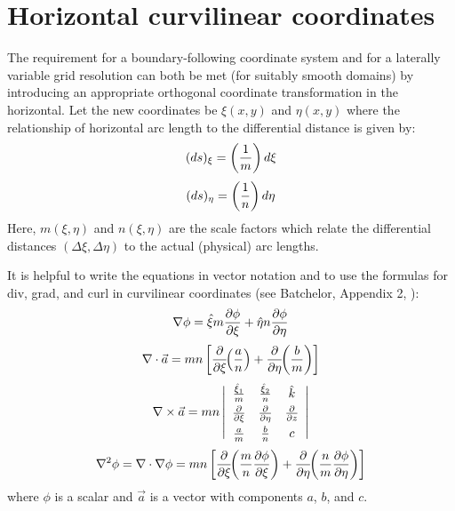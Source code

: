 \section{Horizontal curvilinear coordinates}
\label{Curve}
The requirement for a boundary-following coordinate system and for a
laterally variable grid resolution can both be met (for suitably
smooth domains) by introducing an appropriate orthogonal coordinate
transformation in the horizontal.  Let the new coordinates be
$\xi(x,y)$ and $\eta(x,y)$ where the relationship of horizontal arc
length to the differential distance is given by:
\begin{equation}
   (ds)_{\xi} = \left( {1 \over m} \right) d \xi
\end{equation}
\begin{equation}
   (ds)_{\eta} = \left( {1 \over n} \right) d \eta
\end{equation}
Here, $m(\xi,\eta)$ and $n(\xi,\eta)$ are the scale factors which
relate the differential distances $(\Delta \xi,\Delta \eta)$ to the
actual (physical) arc lengths.

It is helpful to write the equations in vector notation and to use
the formulas for div, grad, and curl in curvilinear coordinates (see
Batchelor, Appendix 2, \cite{Batchelor}):
\begin{equation}
   \nabla \phi = \hat{\xi} m {\partial \phi \over \partial \xi} +
                 \hat{\eta} n {\partial \phi \over \partial \eta}
\end{equation}
\begin{equation}
   \nabla \cdot \vec{a} = mn \left[
   {\partial \over \partial \xi} \!\! \left( {a \over n} \right) +
   {\partial \over \partial \eta} \!\! \left( {b \over m} \right)
   \right]
\end{equation}
\begin{equation}
   \nabla \times \vec{a} = mn \left| \begin{array}{ccc}
   \vspace{1 mm}
   {\hat{\xi}_1 \over m} & {\hat{\xi}_2 \over n} & \hat{k} \\
   \vspace{1 mm}
   {\partial \over \partial \xi} &
   {\partial \over \partial \eta} &
   {\partial \over \partial z} \\
   {a \over m} & {b \over n} & c
   \end{array} \right|
\end{equation}
\begin{equation}
   \nabla^2 \phi = \nabla \cdot \nabla \phi = mn \left[ 
   {\partial \over \partial \xi} \!\! \left( {m \over n} 
   {\partial \phi \over \partial \xi} \right) +
   {\partial \over \partial \eta} \!\! \left( {n \over m} 
   {\partial \phi \over \partial \eta} \right) \right]
\end{equation}
where $\phi$ is a scalar and $\vec{a}$ is a vector with components
$a$, $b$, and $c$.

